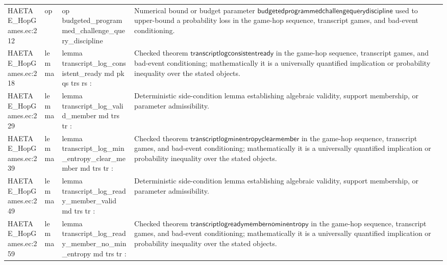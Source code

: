 \documentclass[10pt]{article}
\begin{document}
\begin{longtable}{L{0.11\textwidth}L{0.055\textwidth}L{0.385\textwidth}L{0.41\textwidth}}
HAETAE\_\allowbreak{}HopGames.\allowbreak{}ec:\allowbreak{}212 & op & {\ttfamily\scriptsize op budgeted\_\allowbreak{}programmed\_\allowbreak{}challenge\_\allowbreak{}query\_\allowbreak{}discipline} & Numerical bound or budget parameter $\mathsf{budgetedprogrammedchallengequerydiscipline}$ used to upper-bound a probability loss in the game-hop sequence, transcript games, and bad-event conditioning. \\
HAETAE\_\allowbreak{}HopGames.\allowbreak{}ec:\allowbreak{}218 & lemma & {\ttfamily\scriptsize lemma transcript\_\allowbreak{}log\_\allowbreak{}consistent\_\allowbreak{}ready md pk qs trs rs :} & Checked theorem $\mathsf{transcriptlogconsistentready}$ in the game-hop sequence, transcript games, and bad-event conditioning; mathematically it is a universally quantified implication or probability inequality over the stated objects. \\
HAETAE\_\allowbreak{}HopGames.\allowbreak{}ec:\allowbreak{}229 & lemma & {\ttfamily\scriptsize lemma transcript\_\allowbreak{}log\_\allowbreak{}valid\_\allowbreak{}member md trs tr :} & Deterministic side-condition lemma establishing algebraic validity, support membership, or parameter admissibility. \\
HAETAE\_\allowbreak{}HopGames.\allowbreak{}ec:\allowbreak{}239 & lemma & {\ttfamily\scriptsize lemma transcript\_\allowbreak{}log\_\allowbreak{}min\_\allowbreak{}entropy\_\allowbreak{}clear\_\allowbreak{}member md trs tr :} & Checked theorem $\mathsf{transcriptlogminentropyclearmember}$ in the game-hop sequence, transcript games, and bad-event conditioning; mathematically it is a universally quantified implication or probability inequality over the stated objects. \\
HAETAE\_\allowbreak{}HopGames.\allowbreak{}ec:\allowbreak{}249 & lemma & {\ttfamily\scriptsize lemma transcript\_\allowbreak{}log\_\allowbreak{}ready\_\allowbreak{}member\_\allowbreak{}valid md trs tr :} & Deterministic side-condition lemma establishing algebraic validity, support membership, or parameter admissibility. \\
HAETAE\_\allowbreak{}HopGames.\allowbreak{}ec:\allowbreak{}259 & lemma & {\ttfamily\scriptsize lemma transcript\_\allowbreak{}log\_\allowbreak{}ready\_\allowbreak{}member\_\allowbreak{}no\_\allowbreak{}min\_\allowbreak{}entropy md trs tr :} & Checked theorem $\mathsf{transcriptlogreadymembernominentropy}$ in the game-hop sequence, transcript games, and bad-event conditioning; mathematically it is a universally quantified implication or probability inequality over the stated objects. \\

\end{longtable}
\end{document}
